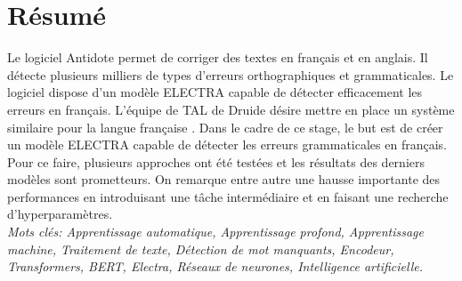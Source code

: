 \documentclass[12pt,twoside,maitrise]{dms}
\theoremstyle{definition}
\numberwithin{equation}{section}
\numberwithin{table}{chapter}
\numberwithin{figure}{chapter}
\begin{document}

\maketitle

\maketitle


\francais

\chapter*{Résumé}
Le logiciel Antidote permet de corriger des textes en français et en anglais.
Il détecte plusieurs milliers de types d’erreurs orthographiques et
grammaticales. Le logiciel dispose d'un modèle ELECTRA capable de détecter
efficacement les erreurs en français. L'équipe de TAL de Druide désire mettre
en place un système similaire pour la langue française . Dans le cadre de ce
stage, le but est de créer un modèle ELECTRA capable de détecter les erreurs
grammaticales en français. Pour ce faire, plusieurs approches ont été testées
et les résultats des derniers modèles sont prometteurs. On remarque entre autre
une hausse importante des performances en introduisant une tâche intermédiaire
et en faisant une recherche d'hyperparamètres.\\

\textit{Mots clés: Apprentissage automatique, Apprentissage profond,
	Apprentissage machine, Traitement de texte, Détection de mot manquants,
	Encodeur, Transformers, BERT, Electra, Réseaux de neurones, Intelligence
	artificielle.}


\end{document}

